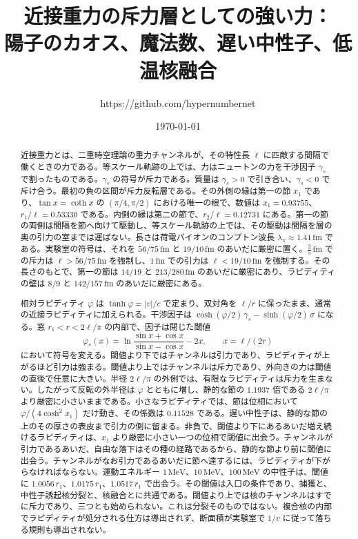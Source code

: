 \documentclass[a4paper]{article}
\title{近接重力の斥力層としての強い力：\\
陽子のカオス、魔法数、遅い中性子、低温核融合}
\author{https://github.com/hypernumbernet}
\date{\today}
\begin{document}
\maketitle

\begin{abstract}
近接重力とは、二重時空理論の重力チャンネルが、その特性長 \(\ell\) に匹敵する間隔で働くときの力である。等スケール軌跡の上では、力はニュートンの力を干渉因子 \(\gamma_s\) で割ったものである。\(\gamma_s\) の符号が斥力である。質量は \(\gamma_s>0\) で引き合い、\(\gamma_s<0\) で斥け合う。最初の負の区間が斥力反転層である。その外側の縁は第一の節 \(x_1\) であり、\(\tan x=\coth x\) の \((\pi/4,\pi/2)\) における唯一の根で、数値は \(x_1=0.93755\)、\(r_1/\ell=0.53330\) である。内側の縁は第二の節で、\(r_2/\ell=0.12731\) にある。第一の節の両側は間隔を節へ向けて駆動し、等スケール軌跡の上では、その駆動は間隔を層の奥の引力の室までは運ばない。長さは荷電パイオンのコンプトン波長 \(\lambda_\pi\approx 1.41\,\mathrm{fm}\) である。実験室の符号は、それを \(56/75\,\mathrm{fm}\) と \(19/10\,\mathrm{fm}\) のあいだに厳密に置く。\(\tfrac25\,\mathrm{fm}\) での斥力は \(\ell>56/75\,\mathrm{fm}\) を強制し、\(1\,\mathrm{fm}\) での引力は \(\ell<19/10\,\mathrm{fm}\) を強制する。その長さのもとで、第一の節は \(14/19\) と \(213/280\,\mathrm{fm}\) のあいだに厳密にあり、ラピディティの壁は \(8/9\) と \(142/157\,\mathrm{fm}\) のあいだに厳密にある。

相対ラピディティ \(\varphi\) は \(\tanh\varphi=|v|/c\) で定まり、双対角を \(\ell/r\) に保ったまま、通常の近接ラピディティに加えられる。干渉因子は \(\cosh(\varphi/2)\,\gamma_s-\sinh(\varphi/2)\,\sigma\) になる。窓 \(r_1<r<2\ell/\pi\) の内部で、因子は閉じた閾値
\[
\varphi_*(x)=\ln\frac{\sin x+\cos x}{\sin x-\cos x}-2x,
\qquad x=\ell/(2r)
\]
において符号を変える。閾値より下ではチャンネルは引力であり、ラピディティが上がるほど引力は強まる。閾値より上ではチャンネルは斥力であり、外向きの力は閾値の直後で任意に大きい。半径 \(2\ell/\pi\) の外側では、有限なラピディティは斥力を生まない。したがって反転の外半径は \(\varphi\) とともに増し、静的な節の \(1.1937\) 倍である \(2\ell/\pi\) より厳密に小さいままである。小さなラピディティでは、節は位相において \(\varphi/(4\cosh^2 x_1)\) だけ動き、その係数は \(0.11528\) である。遅い中性子は、静的な節の上のその厚さの表皮まで引力の側に留まる。非負で、閾値より下にあるあいだ増え続けるラピディティは、\(x_1\) より厳密に小さい一つの位相で閾値に出会う。チャンネルが引力であるあいだ、自由な落下はその種の経路であるから、静的な節より前に閾値に出会う。チャンネルがなお引力であるあいだに節へ達するには、ラピディティが下がらなければならない。運動エネルギー \(1\,\mathrm{MeV}\)、\(10\,\mathrm{MeV}\)、\(100\,\mathrm{MeV}\) の中性子は、閾値に \(1.0056\,r_1\)、\(1.0175\,r_1\)、\(1.0517\,r_1\) で出会う。その閾値は入口の条件であり、捕獲と、中性子誘起核分裂と、核融合とに共通である。閾値より上では核のチャンネルはすでに斥力であり、三つとも始められない。これは分裂そのものではない。複合核の内部でラピディティが処分される仕方は導出されず、断面積が実験室で \(1/v\) に従って落ちる規則も導出されない。


\end{abstract}
\end{document}
